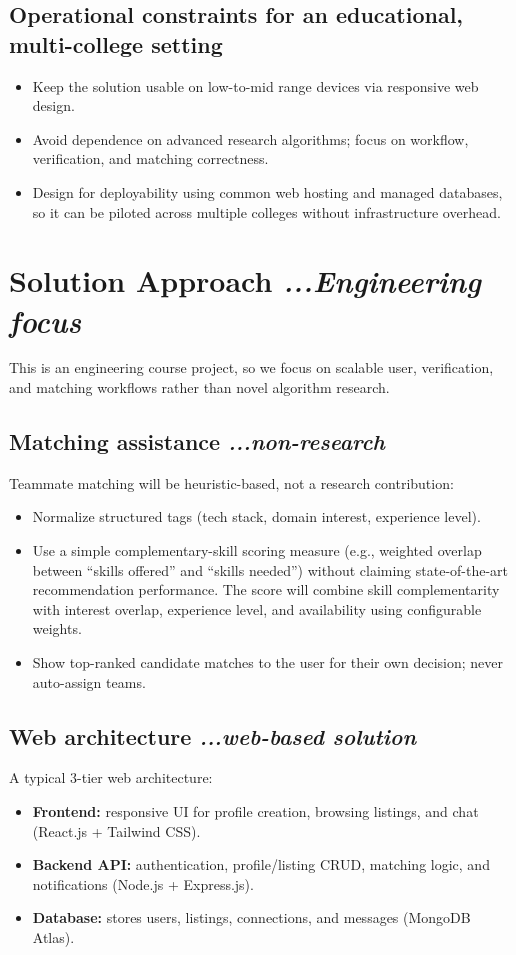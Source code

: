 \documentclass[11pt]{article}
\begin{document}
\subsection{Operational constraints for an educational, multi-college setting}
\begin{itemize}[leftmargin=*]
  \item Keep the solution usable on low-to-mid range devices via responsive web design.
  \item Avoid dependence on advanced research algorithms; focus on workflow, verification, and
  matching correctness.
  \item Design for deployability using common web hosting and managed databases, so it can be
  piloted across multiple colleges without infrastructure overhead.
\end{itemize}

\section{Solution Approach \textit{...Engineering focus}}
This is an engineering course project, so we focus on scalable user, verification, and matching
workflows rather than novel algorithm research.

\subsection{Matching assistance \textit{...non-research}}
Teammate matching will be heuristic-based, not a research contribution:
\begin{itemize}[leftmargin=*]
  \item Normalize structured tags (tech stack, domain interest, experience level).
  \item Use a simple complementary-skill scoring measure (e.g., weighted overlap between
  ``skills offered'' and ``skills needed'') without claiming state-of-the-art recommendation
  performance. The score will combine skill complementarity with interest overlap, experience
  level, and availability using configurable weights.
  \item Show top-ranked candidate matches to the user for their own decision; never
  auto-assign teams.
\end{itemize}

\subsection{Web architecture \textit{...web-based solution}}
A typical 3-tier web architecture:
\begin{itemize}[leftmargin=*]
  \item \textbf{Frontend:} responsive UI for profile creation, browsing listings, and chat
  (React.js + Tailwind CSS).
  \item \textbf{Backend API:} authentication, profile/listing CRUD, matching logic, and
  notifications (Node.js + Express.js).
  \item \textbf{Database:} stores users, listings, connections, and messages (MongoDB Atlas).
\end{itemize}
\end{document}
